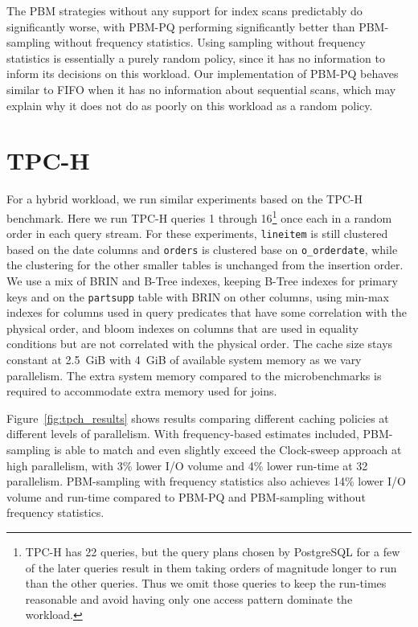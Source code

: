 The PBM strategies without any support for index scans predictably do significantly worse, with PBM-PQ performing significantly better than PBM-sampling without frequency statistics. Using sampling without frequency statistics is essentially a purely random policy, since it has no information to inform its decisions on this workload. Our implementation of PBM-PQ behaves similar to FIFO when it has no information about sequential scans, which may explain why it does not do as poorly on this workload as a random policy.


\section{TPC-H}

For a hybrid workload, we run similar experiments based on the TPC-H~\cite{tpch} benchmark. Here we run TPC-H queries 1 through 16\footnote{TPC-H has 22 queries, but the query plans chosen by PostgreSQL for a few of the later queries result in them taking orders of magnitude longer to run than the other queries. Thus we omit those queries to keep the run-times reasonable and avoid having only one access pattern dominate the workload.} once each in a random order in each query stream. For these experiments, \verb|lineitem| is still clustered based on the date columns and \verb|orders| is clustered base on \verb|o_orderdate|, while the clustering for the other smaller tables is unchanged from the insertion order. We use a mix of BRIN and B-Tree indexes, keeping B-Tree indexes for primary keys and on the \verb|partsupp| table with BRIN on other columns, using min-max indexes for columns used in query predicates that have some correlation with the physical order, and bloom indexes on columns that are used in equality conditions but are not correlated with the physical order. The cache size stays constant at 2.5~GiB with 4~GiB of available system memory as we vary parallelism. The extra system memory compared to the microbenchmarks is required to accommodate extra memory used for joins.

Figure~\ref{fig:tpch_results} shows results comparing different caching policies at different levels of parallelism. With frequency-based estimates included, PBM-sampling is able to match and even slightly exceed the Clock-sweep approach at high parallelism, with 3\% lower I/O volume and 4\% lower run-time at 32 parallelism. PBM-sampling with frequency statistics also achieves 14\% lower I/O volume and run-time compared to PBM-PQ and PBM-sampling without frequency statistics.

